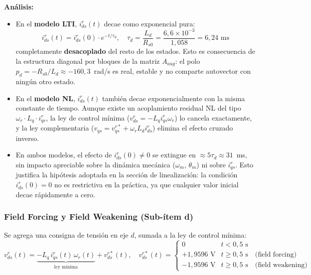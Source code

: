 \documentclass[12pt, a4paper,journal, onecolumn, compsoc]{IEEEtran}
\begin{document}
\textbf{Análisis:}
\begin{itemize}
    \item En el \textbf{modelo LTI}, $i_{ds}^r(t)$ decae como exponencial pura:
    \begin{equation}
        i_{ds}^r(t) = i_{ds}^r(0) \cdot e^{-t/\tau_d}, \quad \tau_d = \frac{L_d}{R_{s0}} = \frac{6{,}6 \times 10^{-3}}{1{,}058} = 6{,}24 \text{ ms}
    \end{equation}
    completamente \textbf{desacoplado} del resto de los estados. Esto es consecuencia de la estructura diagonal por bloques de la matriz $A_{aug}$: el polo $p_d = -R_{s0}/L_d \approx -160{,}3$~rad/s es real, estable y no comparte autovector con ningún otro estado.

    \item En el \textbf{modelo NL}, $i_{ds}^r(t)$ también decae exponencialmente con la misma constante de tiempo. Aunque existe un acoplamiento residual NL del tipo $\omega_r \cdot L_q \cdot i_{qs}^r$, la ley de control mínima ($v_{ds}^r = -L_q i_{qs}^r \omega_r$) lo cancela exactamente, y la ley complementaria ($v_{qs} = v_{qs}^{r*} + \omega_r L_d i_{ds}^r$) elimina el efecto cruzado inverso.

    \item En ambos modelos, el efecto de $i_{ds}^r(0) \neq 0$ se extingue en $\approx 5\tau_d \approx 31$~ms, sin impacto apreciable sobre la dinámica mecánica ($\omega_m$, $\theta_m$) ni sobre $i_{qs}^r$. Esto justifica la hipótesis adoptada en la sección de linealización: la condición $i_{ds}^r(0) = 0$ no es restrictiva en la práctica, ya que cualquier valor inicial decae rápidamente a cero.
\end{itemize}

\subsubsection{Field Forcing y Field Weakening (Sub-ítem d)}
\label{sec:sim_item_d}

Se agrega una consigna de tensión en eje $d$, sumada a la ley de control mínima:
\begin{equation}
    v_{ds}^r(t) = \underbrace{-L_q \, i_{qs}^r(t) \, \omega_r(t)}_{\text{ley mínima}} + v_{ds}^{r*}(t), \quad
    v_{ds}^{r*}(t) = \begin{cases}
    0 & t < 0{,}5 \text{ s} \\
    +1{,}9596 \text{ V} & t \geq 0{,}5 \text{ s} \quad \text{(field forcing)}\\
    -1{,}9596 \text{ V} & t \geq 0{,}5 \text{ s} \quad \text{(field weakening)}
    \end{cases}
\end{equation}
\end{document}
